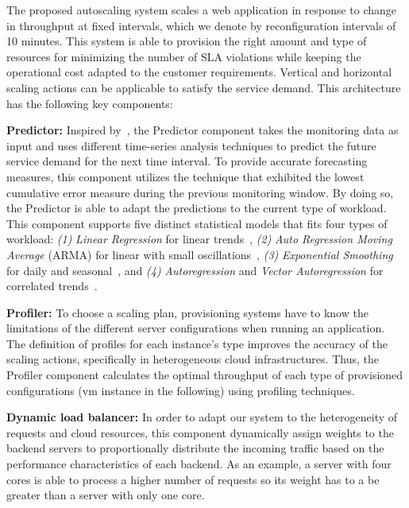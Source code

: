 

The proposed autoscaling system scales a web application in response to change in throughput at fixed intervals, which we denote by reconfiguration intervals of 10 minutes. This system is able to provision the right amount and type of resources for minimizing the number of SLA violations while keeping the operational cost adapted to the customer requirements. Vertical and horizontal scaling actions can be applicable to satisfy the service demand. This architecture has the following key components:

\vspace{2mm}

\textbf{Predictor: } Inspired by~\cite{wolski_network_1999}, the Predictor component takes the monitoring data as input and uses different time-series analysis techniques to predict the future service demand for the next time interval. To provide accurate forecasting measures, this component utilizes the technique that exhibited the lowest cumulative error measure during the previous monitoring window. By doing so, the Predictor is able to adapt the predictions to the current type of workload. This component supports five distinct statistical models that fits four types of workload: \emph{(1)} \emph{Linear Regression} for linear trends~\cite{muppala_regression-based_2012}, \emph{(2)} \emph{Auto Regression Moving Average} (ARMA) for linear with small oscillations~\cite{roy_efficient_2011}, \emph{(3)} \emph{Exponential Smoothing} for daily and seasonal~\cite{exponential_smoothing2010}, and \emph{(4)} \emph{Autoregression} and \emph{Vector Autoregression} for correlated trends~\cite{vector_autoregression_2006,chandra_dynamic_2003}. 

\vspace{2mm}

\textbf{Profiler: } To choose a scaling plan, provisioning systems have to know the limitations of the different server configurations when running an application. The definition of profiles for each instance's type improves the accuracy of the scaling actions, specifically in heterogeneous cloud infrastructures. Thus, the Profiler component calculates the optimal throughput of each type of provisioned configurations (vm instance in the following) using profiling techniques.


\vspace{2mm}

\textbf{Dynamic load balancer: } In order to adapt our system to the heterogeneity of requests and cloud resources, this component dynamically assign weights to the backend servers to proportionally distribute the incoming traffic based on the performance characteristics of each backend. As an example, a server with four cores is able to process a higher number of requests so its weight has to a be greater than a server with only one core.

